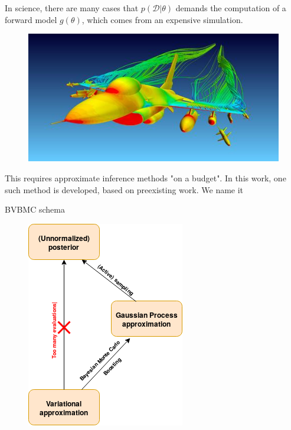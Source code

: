 \documentclass{beamer}
\begin{document}
\begin{frame}
\begin{block}{}
In science, there are many cases that $p(\mathcal{D}|\theta)$ demands the computation of a forward model $g(\theta)$, which comes from an expensive simulation.
\begin{figure}[h]
\centering
\includegraphics[height=0.3\paperheight]{figs/simulation_figure.jpg}
\end{figure}
\pause
This requires approximate inference methods "on a budget". In this work, one such method is developed, based on preexisting work. We name it
\pause 
\begin{block}{}
\end{block}
\end{block}
\end{frame}

\begin{frame}{}
\begin{block}{BVBMC schema}
\begin{figure}[h]
\centering
\includegraphics[height=.5\linewidth]{figs/diagram1a.png}
\end{figure}
\end{block}
\end{frame}
\end{document}
